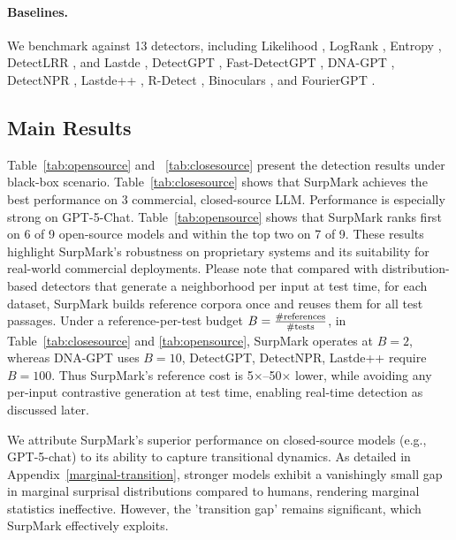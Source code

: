 \documentclass{article}
\theoremstyle{plain}
\theoremstyle{definition}
\theoremstyle{remark}
\begin{document}
\paragraph{Baselines.}
We benchmark against 13 detectors, including Likelihood \cite{solaiman2019releasestrategiessocialimpacts}, LogRank \cite{solaiman2019releasestrategiessocialimpacts}, Entropy \cite{gehrmann-etal-2019-gltr,ippolito2020automaticdetectiongeneratedtext}, DetectLRR \cite{su2023detectllm}, and Lastde \cite{xu2025trainingfree},  DetectGPT \cite{mitchell2023detectgptzeroshotmachinegeneratedtext}, Fast-DetectGPT \cite{bao2024fastdetectgpt}, DNA-GPT \cite{yang2023dnagptdivergentngramanalysis}, DetectNPR \cite{su2023detectllm}, Lastde++ \cite{xu2025trainingfree}, R-Detect \cite{song2025deep}, Binoculars \cite{hans2024spotting}, and FourierGPT \cite{xu2024detectingsubtledifferenceshuman}. 


\subsection{Main Results}

Table~\ref{tab:opensource} and ~\ref{tab:closesource} present the detection results under black-box scenario. Table~\ref{tab:closesource} shows that SurpMark achieves the best performance on 3 commercial, closed-source LLM. Performance is especially strong on GPT-5-Chat. Table~\ref{tab:opensource} shows that SurpMark ranks first on 6 of 9 open-source models and within the top two on 7 of 9. These results highlight SurpMark’s robustness on proprietary systems and its suitability for real-world commercial deployments. Please note that compared with distribution-based detectors that generate a neighborhood per input at test time, for each dataset, SurpMark builds reference corpora once and reuses them for all test passages. Under a reference-per-test budget $B=\frac{\#\rm{references}}{\# \rm{tests}}$, in Table~\ref{tab:closesource} and \ref{tab:opensource}, SurpMark operates at $B=2$, whereas DNA-GPT uses $B=10$, DetectGPT, DetectNPR, Lastde++ require $B=100$. Thus SurpMark’s reference cost is 5$\times$–50$\times$ lower, while avoiding any per-input contrastive generation at test time, enabling real-time detection as discussed later. 

We attribute SurpMark's superior performance on closed-source models (e.g., GPT-5-chat) to its ability to capture transitional dynamics. As detailed in Appendix~\ref{marginal-transition}, stronger models exhibit a vanishingly small gap in marginal surprisal distributions compared to humans, rendering marginal statistics ineffective. However, the 'transition gap' remains significant, which SurpMark effectively exploits.
\end{document}
